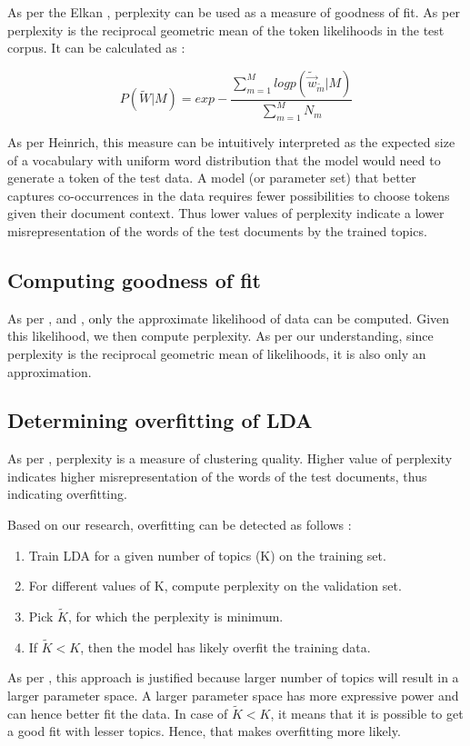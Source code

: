 \documentclass[11pt,a4paper,oneside]{article}
\begin{document}
As per the Elkan \cite{perplexity}, perplexity can be used as a measure of goodness of fit. As per \cite{heinrich} perplexity is the reciprocal geometric mean of the token likelihoods in the test corpus. It can be calculated as :

\begin{equation}
P( \tilde{W} | M) = exp - \frac{\sum_{m=1}^{M}log p (\tilde{\overrightarrow{w}}_{\tilde{m}} | M)}{\sum_{m=1}^{M} N_m}
\end{equation}

As per Heinrich, this measure can be intuitively interpreted as the expected size of a vocabulary with uniform word distribution that the model would need to generate a token of the test data. A model (or parameter set) that better captures co-occurrences in the data requires fewer possibilities to choose tokens given their document context. Thus lower values of perplexity indicate a lower misrepresentation of the words of the test documents by the trained topics.

\subsection{Computing goodness of fit}
As per \cite{nguyen},\cite{heinrich} and \cite{griffiths2004finding}, only the approximate likelihood of data can be computed. Given this likelihood, we then compute perplexity. As per our understanding, since perplexity is the reciprocal geometric mean of likelihoods, it is also only an approximation.

\subsection{Determining overfitting of LDA}
As per \cite{heinrich}, perplexity is a measure of clustering quality. Higher value of perplexity indicates higher misrepresentation of the words of the test documents, thus indicating overfitting.

Based on our research, overfitting can be detected as follows :
\begin{enumerate}
\item Train LDA for a given number of topics (K) on the training set.
\item For different values of K, compute perplexity on the validation set.
\item Pick $\tilde{K}$, for which the perplexity is minimum.
\item If $\tilde{K} < K$, then the model has likely overfit the training data.
\end{enumerate}

As per \cite{nguyen}, this approach is justified because larger number of topics will result in a larger parameter space. A larger parameter space has more expressive power and can hence better fit the data. In case of $\tilde{K} < K$, it means that it is possible to get a good fit with lesser topics. Hence, that makes overfitting more likely.

\newpage



\end{document}
